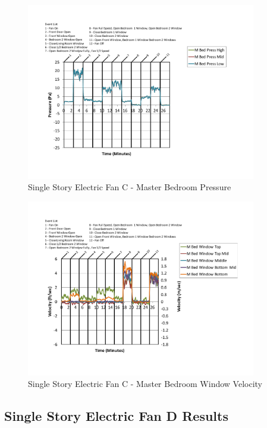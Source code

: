 \documentclass{article}
\begin{document}
\begin{appendices}
	\begin{figure}[H]
		\centering
		\includegraphics[height=3.05in,trim=0.67in 1.1in 0.67in 0.8in,clip=true]{0_Images/Results_Charts/ColdFlow/Single_Story/Electric/C/Master_Bedroom_Pressure.pdf}
		\caption{Single Story Electric Fan C - Master Bedroom Pressure}
	\end{figure}
 

	\begin{figure}[H]
		\centering
		\includegraphics[height=3.05in,trim=0.67in 1.1in 0.67in 0.8in,clip=true]{0_Images/Results_Charts/ColdFlow/Single_Story/Electric/C/Master_Bedroom_Window_Velocity.pdf}
		\caption{Single Story Electric Fan C - Master Bedroom Window Velocity}
	\end{figure}
 
	\clearpage

		\clearpage
\clearpage		\large
\subsection{Single Story Electric Fan D Results} \label{App:Single_StoryElectricFanDResults} 


\end{appendices}
\end{document}
